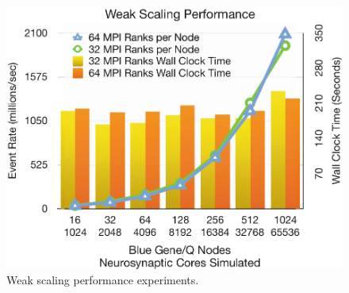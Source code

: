 \begin{figure}[t!]
\centering
\includegraphics[width=\linewidth]{result_img/weak_scaling_en_chart.pdf}
\caption{
	Weak scaling performance experiments.
}
\label{fig:weak}
\end{figure}
